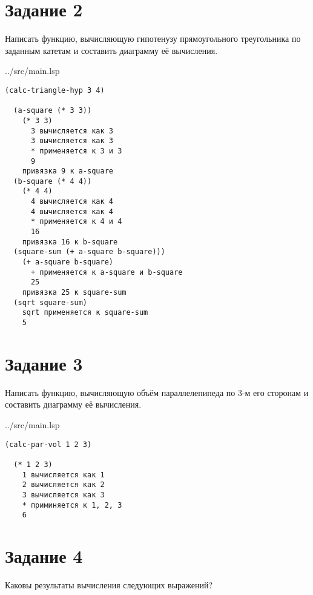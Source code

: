 \section*{Задание 2}

Написать функцию, вычисляющую гипотенузу прямоугольного треугольника по заданным катетам и составить диаграмму её вычисления.

\begin{lstinputlisting}[
	caption={Задание 2},
	label={lst:t2},
	style={lsp},
	linerange={11-16},
	]{../src/main.lsp}
\end{lstinputlisting}

\begin{lstlisting}[style={scheme}]
(calc-triangle-hyp 3 4)
	
  (a-square (* 3 3))
    (* 3 3)
      3 вычисляется как 3
      3 вычисляется как 3
      * применяется к 3 и 3
      9
    привязка 9 к a-square
  (b-square (* 4 4))
    (* 4 4)
      4 вычисляется как 4
      4 вычисляется как 4
      * применяется к 4 и 4
      16
    привязка 16 к b-square
  (square-sum (+ a-square b-square)))
    (+ a-square b-square)
      + применяется к a-square и b-square
      25
    привязка 25 к square-sum
  (sqrt square-sum)
    sqrt применяется к square-sum
    5
\end{lstlisting}

\section*{Задание 3}

Написать функцию, вычисляющую объём параллелепипеда по 3-м его сторонам и составить диаграмму её вычисления.

\begin{lstinputlisting}[
	caption={Задание 3},
	label={lst:t3},
	style={lsp},
	linerange={18-20},
	]{../src/main.lsp}
\end{lstinputlisting}

\begin{lstlisting}[style={scheme}]
(calc-par-vol 1 2 3)
	
  (* 1 2 3)
    1 вычисляется как 1
    2 вычисляется как 2
    3 вычисляется как 3
    * приминяется к 1, 2, 3
    6
\end{lstlisting}

\section*{Задание 4}

Каковы результаты вычисления следующих выражений?

